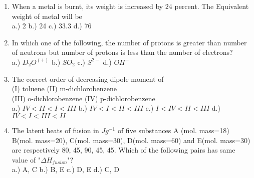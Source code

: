 \documentclass{article}
\begin{document}
\begin{enumerate}
 \item \large When a metal is burnt, its weight is increased by 24 percent. The Equivalent weight of metal will be\\

		a.) 2 \hspace{2.5cm} b.) 24 \hspace{2.5cm} c.) 33.3 \hspace{2.5cm} d.) 76\\

\item \large In which one of the following, the number of protons is greater than number of neutrons but number of protons is less than the number of electrons?\\

		a.) $D_2O^{(+)}$ \hspace{2.2cm} b.) $SO_2$ \hspace{2.2cm} c.) $S^{2-}$ \hspace{2.2cm} d.) $OH^{-}$\\

\item \large The correct order of decreasing dipole moment of \\
		(I) toluene \hspace{6.1cm} (II) m-dichlorobenzene\\
		(III) o-dichlorobenzene \hspace{3.9cm} (IV) p-dichlorobenzene\\

		a.) $IV<II<I<III$ \hspace{1cm} b.) $IV<I<II<III$ \hspace{1cm} c.) $I<IV<II<III$
\hspace{1cm} d.) $IV<I<III<II$\\

\item \large The latent heats of fusion in $Jg^{-1}$ of five substances A (mol. mass=18) B(mol. mass=20), C(mol. mass=30), D(mol. mass=60) and E(mol. mass=30) are respectively 80, 45, 90, 45, 45. Which of the following pairs has same value of "$\Delta H_{fusion}$"?\\

		a.) A, C \hspace{2.5cm} b.) B, E \hspace{2.5cm} c.) D, E \hspace{2.5cm} d.) C, D\\


\end{enumerate}
\end{document}
